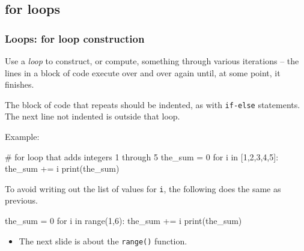 \documentclass{beamer}
\newenvironment{codeblock}
    {\hfill\begin{beamerboxesrounded}[lower=codecol, width=0.8\textwidth]
    \medskip

    }
    { 
    \end{beamerboxesrounded}\hfill
    }
\theoremstyle{example}
\newcommand{\ttt}[1]{{\small\texttt{#1}}}
\begin{document}
\subsection{for loops}
\begin{frame}[fragile]
\frametitle{Loops: {\ttm for} loop construction}

Use a \emph{loop} to construct, or compute, something through various iterations {--} the lines in a block of code execute over and over again until, at some point, it finishes.

The block of code that repeats should be indented, as with \ttt{if-else} statements. The next line not indented is outside that loop.

Example:

\begin{codeblock}

\begin{python}
# for loop that adds integers 1 through 5
the_sum = 0
for i in [1,2,3,4,5]:
    the_sum += i
print(the_sum)
\end{python}

\end{codeblock}

To avoid writing out the list of values for \ttt{i}, the following does the same as previous.

\begin{codeblock}

\begin{python}
the_sum = 0
for i in range(1,6):
    the_sum += i
print(the_sum)
\end{python}
	
\end{codeblock}
\begin{itemize}
    \item[] The next slide is about the \ttt{range()} function.
\end{itemize}
\end{frame}
\end{document}
